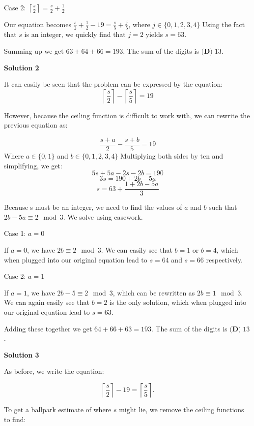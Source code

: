 \begin{enumerate}
 Case 2: $\left\lceil \frac{s}{2} \right\rceil = \frac{s}{2}+\frac{1}{2}$

 Our equation becomes $\frac{s}{2} +\frac{1}{2} - 19 = \frac{s}{5} + \frac{j}{5}$, where $j \in \{0,1,2,3,4\}$ Using the fact that $s$ is an integer, we quickly find that $j=2$ yields $s=63$.

 Summing up we get $63+64+66=193$. The sum of the digits is $\boxed{\textbf{(D)}\; 13}$.

 



\textbf{Solution 2}

It can easily be seen that the problem can be expressed by the equation:
 \[\left\lceil \frac{s}{2} \right\rceil - \left\lceil \frac{s}{5} \right\rceil = 19\]

 However, because the ceiling function is difficult to work with, we can rewrite the previous equation as:

 
 \[\frac{s+a}{2} - \frac{s+b}{5} = 19\] Where $a \in \{0,1\}$ and $b \in \{0,1,2,3,4\}$ Multiplying both sides by ten and simplifying, we get:
 \[5s+5a-2s-2b=190\]
 \[3s = 190+2b-5a\]
 \[s = 63 + \frac{1+2b-5a}{3}\]

 Because s must be an integer, we need to find the values of $a$ and $b$ such that $2b-5a \equiv 2 \mod 3$. We solve using casework.

 Case 1: $a = 0$

 If $a = 0$, we have $2b \equiv 2 \mod 3$. We can easily see that $b = 1$ or $b = 4$, which when plugged into our original equation lead to $s = 64$ and $s=66$ respectively.

 


 Case 2: $a = 1$

 If $a = 1$, we have $2b-5 \equiv 2 \mod 3$, which can be rewritten as $2b \equiv 1 \mod 3$. We can again easily see that $b = 2$ is the only solution, which when plugged into our original equation lead to $s = 63$.

 Adding these together we get $64+66+63=193$. The sum of the digits is $\boxed{\textbf{(D)}\; 13}$.

 



\textbf{Solution 3}

As before, we write the equation:

 
 \[\left\lceil \frac{s}{2} \right\rceil - 19 = \left\lceil \frac{s}{5} \right\rceil.\]

 To get a ballpark estimate of where $s$ might lie, we remove the ceiling functions to find:


\end{enumerate}
